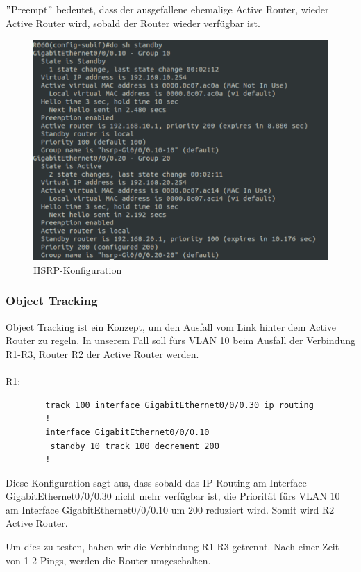 \documentclass[a4paper, ngerman]{article}
\begin{document}
$"$Preempt$"$ bedeutet, dass der ausgefallene ehemalige Active Router, wieder Active Router wird, sobald der Router wieder verfügbar ist.

\begin{figure}[H]
    \centering
    \includegraphics[scale=0.23]{screenshots/sh_standby before.png}
    \caption{HSRP-Konfiguration}
\end{figure}

\subsubsection{Object Tracking}
Object Tracking ist ein Konzept, um den Ausfall vom Link hinter dem Active Router zu regeln.
In unserem Fall soll fürs VLAN 10 beim Ausfall der Verbindung R1-R3, Router R2 der Active Router werden.
\\ \\
R1:
\begin{framed}
    \begin{verbatim}
        track 100 interface GigabitEthernet0/0/0.30 ip routing
        !
        interface GigabitEthernet0/0/0.10
         standby 10 track 100 decrement 200
        !
    \end{verbatim}
\end{framed}

Diese Konfiguration sagt aus, dass sobald das IP-Routing am Interface GigabitEthernet0/0/0.30 nicht mehr verfügbar ist,
die Priorität fürs VLAN 10 am Interface GigabitEthernet0/0/0.10 um 200 reduziert wird. Somit wird R2 Active Router.

Um dies zu testen, haben wir die Verbindung R1-R3 getrennt. Nach einer Zeit von 1-2 Pings, werden die Router umgeschalten.
\end{document}
